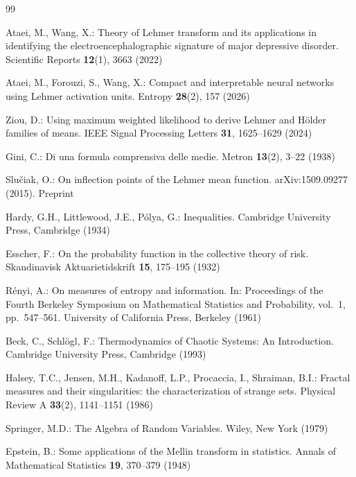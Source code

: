\documentclass[sn-mathphys-num]{sn-jnl}
\theoremstyle{thmstyleone}%
\theoremstyle{thmstyletwo}%
\theoremstyle{thmstylethree}%
\theoremstyle{thmstyleone}%
\begin{document}
	
	\begin{thebibliography}{99}
		
		Ataei, M., Wang, X.: Theory of Lehmer transform and its
		applications in identifying the electroencephalographic signature
		of major depressive disorder. Scientific Reports \textbf{12}(1),
		3663 (2022)
		
		Ataei, M., Forouzi, S., Wang, X.: Compact and interpretable
		neural networks using Lehmer activation units. Entropy
		\textbf{28}(2), 157 (2026)
		
		Ziou, D.: Using maximum weighted likelihood to derive Lehmer and
		H\"older families of means. IEEE Signal Processing Letters
		\textbf{31}, 1625--1629 (2024)
		
		Gini, C.: Di una formula comprensiva delle medie. Metron
		\textbf{13}(2), 3--22 (1938)
		
		Slu\v{c}iak, O.: On inflection points of the Lehmer mean function.
		arXiv:1509.09277 (2015). Preprint
		
		Hardy, G.H., Littlewood, J.E., P\'olya, G.: Inequalities.
		Cambridge University Press, Cambridge (1934)
		
		Esscher, F.: On the probability function in the collective
		theory of risk. Skandinavisk Aktuarietidskrift \textbf{15},
		175--195 (1932)
		
		R\'enyi, A.: On measures of entropy and information. In:
		Proceedings of the Fourth Berkeley Symposium on Mathematical
		Statistics and Probability, vol.~1, pp.~547--561. University of
		California Press, Berkeley (1961)
		
		Beck, C., Schl\"ogl, F.: Thermodynamics of Chaotic Systems: An
		Introduction. Cambridge University Press, Cambridge (1993)
		
		Halsey, T.C., Jensen, M.H., Kadanoff, L.P., Procaccia, I.,
		Shraiman, B.I.: Fractal measures and their singularities: the
		characterization of strange sets. Physical Review A
		\textbf{33}(2), 1141--1151 (1986)
		
		Springer, M.D.: The Algebra of Random Variables. Wiley, New
		York (1979)
		
		Epstein, B.: Some applications of the Mellin transform in
		statistics. Annals of Mathematical Statistics \textbf{19},
		370--379 (1948)
		

\end{thebibliography}
\end{document}
